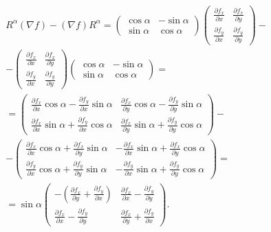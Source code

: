\documentclass{article}
\begin{document}
\begin{multline*}
  R^\alpha (\nabla f) - (\nabla f) R^\alpha = 
  \begin{pmatrix} 
    \cos \alpha & -\sin \alpha \\ 
    \sin \alpha & \cos \alpha 
  \end{pmatrix}
  \begin{pmatrix} 
    \frac{\partial f_x}{\partial x} & \frac{\partial f_x}{\partial y} \\
    \frac{\partial f_y}{\partial x} & \frac{\partial f_y}{\partial y} 
  \end{pmatrix} - \\
  - \begin{pmatrix} 
    \frac{\partial f_x}{\partial x} & \frac{\partial f_x}{\partial y} \\
    \frac{\partial f_y}{\partial x} & \frac{\partial f_y}{\partial y} 
  \end{pmatrix}
  \begin{pmatrix} 
    \cos \alpha & -\sin \alpha \\
    \sin \alpha & \cos \alpha 
  \end{pmatrix} = \\
  = \begin{pmatrix}
    \frac{\partial f_x}{\partial x} \cos \alpha - \frac{\partial f_y}{\partial x} \sin \alpha &
    \frac{\partial f_x}{\partial y} \cos \alpha - \frac{\partial f_y}{\partial y} \sin \alpha \\
    \frac{\partial f_x}{\partial x} \sin \alpha + \frac{\partial f_y}{\partial x} \cos \alpha &
    \frac{\partial f_x}{\partial y} \sin \alpha + \frac{\partial f_y}{\partial y} \cos \alpha 
  \end{pmatrix} - \\
  - \begin{pmatrix} 
    \frac{\partial f_x}{\partial x} \cos \alpha + \frac{\partial f_x}{\partial y} \sin \alpha &
    - \frac{\partial f_x}{\partial x} \sin \alpha + \frac{\partial f_x}{\partial y} \cos \alpha \\
    \frac{\partial f_y}{\partial x} \cos \alpha + \frac{\partial f_y}{\partial y} \sin \alpha &
    - \frac{\partial f_y}{\partial x} \sin \alpha + \frac{\partial f_y}{\partial y} \cos \alpha 
  \end{pmatrix} = \\
  = \sin \alpha \begin{pmatrix}
    -(\frac{\partial f_x}{\partial y} + \frac{\partial f_y}{\partial x}) &
    \frac{\partial f_x}{\partial x} - \frac{\partial f_y}{\partial y} \\
    \frac{\partial f_x}{\partial x} - \frac{\partial f_y}{\partial y} &
    \frac{\partial f_x}{\partial y} + \frac{\partial f_y}{\partial x} 
  \end{pmatrix}.
\end{multline*}
\end{document}
